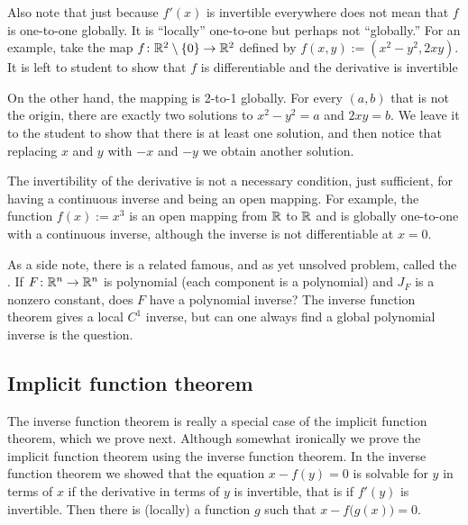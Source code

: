 \begin{example}
Also note that just because $f'(x)$ is invertible everywhere does not
mean that $f$ is
one-to-one globally.  It is ``locally'' one-to-one but perhaps not
``globally.''  For an
example, take the map $f \colon {\mathbb{R}}^2 \setminus \{ 0 \} \to {\mathbb{R}}^2$ defined
by $f(x,y) := (x^2-y^2,2xy)$.
It is left to student to show that $f$ is
differentiable and the derivative is invertible

On the other hand, the mapping is 2-to-1 globally.  For every
$(a,b)$ that is not the origin, there are exactly two
solutions to $x^2-y^2=a$ and $2xy=b$.  We leave it to the student
to show that there is at least one solution, and then notice
that replacing $x$ and $y$ with $-x$ and $-y$ we obtain another solution.
\end{example}

The invertibility of the derivative is not a necessary
condition, just sufficient, for having a continuous inverse and being an open
mapping.  For example, the function $f(x) := x^3$ is an open mapping from ${\mathbb{R}}$
to ${\mathbb{R}}$ and is globally one-to-one with a continuous inverse, although the
inverse is not differentiable at $x=0$.

\medskip

As a side note, there is a related famous, and as yet unsolved problem,
called the \emph{}.  If $F \colon {\mathbb{R}}^n \to
{\mathbb{R}}^n$ is polynomial (each component is a polynomial) and $J_F$ is a nonzero
constant, does $F$ have a polynomial inverse?
The inverse function theorem gives a local $C^1$ inverse, but can one always
find a global polynomial inverse is the question.

\subsection{Implicit function theorem}

The inverse function theorem is really a special case of the implicit
function theorem, which we prove next.  Although somewhat ironically we 
prove the implicit function theorem using the inverse function theorem.
In the inverse function theorem we showed that
the equation $x-f(y) = 0$ is solvable for $y$ in terms of $x$ if the derivative
in terms of $y$ is invertible, that is if $f'(y)$ is invertible.
Then there is (locally) a
function $g$ such that $x-f\bigl(g(x)\bigr) = 0$.

